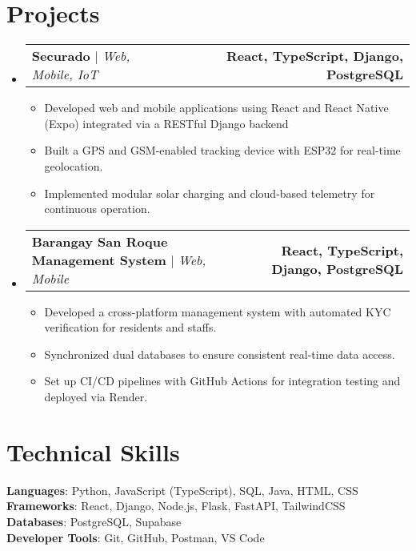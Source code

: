 \documentclass[letterpaper,11pt]{article}
\makeatletter
\newcommand{\resumeItem}[1]{
  \item\small{
    {#1 \vspace{0pt}}
  }
}
\newcommand{\resumeProjectHeading}[2]{
    \item
    \begin{tabular*}{1.001\textwidth}{l@{\extracolsep{\fill}}r}
      \small#1 & \textbf{\small #2}\\
    \end{tabular*}\vspace{-7pt}
}
\newcommand{\resumeSubHeadingListStart}{\begin{itemize}[leftmargin=0.0in, label={}]}
\newcommand{\resumeSubHeadingListEnd}{\end{itemize}}\vspace{0pt}
\newcommand{\resumeItemListStart}{\begin{itemize}}
\newcommand{\resumeItemListEnd}{\end{itemize}\vspace{-5pt}}
\makeatother
\begin{document}
\section{Projects} 
    \vspace{-5pt}
    \resumeSubHeadingListStart
    \resumeProjectHeading{\textbf{Securado} $|$ \emph{Web, Mobile, IoT}}{React, TypeScript, Django, PostgreSQL}
      \resumeItemListStart
        \resumeItem{Developed web and mobile applications using React and React Native (Expo) integrated via a RESTful Django backend}
        \resumeItem{Built a GPS and GSM-enabled tracking device with ESP32 for real-time geolocation.}
        \resumeItem{Implemented modular solar charging and cloud-based telemetry for continuous operation.}
      \resumeItemListEnd
    \vspace{-20pt}
    \resumeProjectHeading
      {\textbf{Barangay San Roque Management System} $|$ \emph{Web, Mobile}}{React, TypeScript, Django, PostgreSQL}
      \resumeItemListStart
        \resumeItem{Developed a cross-platform management system with automated KYC verification for residents and staffs.}
        \resumeItem{Synchronized dual databases to ensure consistent real-time data access.}
        \resumeItem{Set up CI/CD pipelines with GitHub Actions for integration testing and deployed via Render.}
      \resumeItemListEnd
\resumeSubHeadingListEnd
\vspace{-12pt}

\section{Technical Skills}
 \begin{itemize}[leftmargin=0.15in, label={}]
    \small{\item{   
      \textbf{Languages}{: Python, JavaScript (TypeScript), SQL, Java, HTML, CSS} \\[1mm]
      \textbf{Frameworks}{: React, Django, Node.js, Flask, FastAPI, TailwindCSS} \\[1mm]
      \textbf{Databases}{: PostgreSQL, Supabase} \\[1mm]
      \textbf{Developer Tools}{: Git, GitHub, Postman, VS Code}
    }}
 \end{itemize}
 \vspace{-16pt}
 \vspace{3pt}
\vspace{10pt}

\vspace{-15pt}
\end{document}
